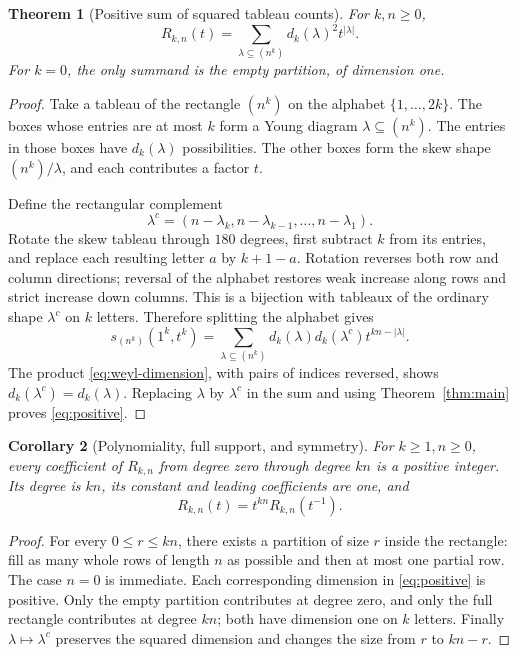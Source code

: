 \documentclass[11pt,a4paper]{article}
\newtheorem{theorem}{Theorem}[section]
\newtheorem{corollary}[theorem]{Corollary}
\theoremstyle{definition}
\theoremstyle{remark}
\numberwithin{equation}{section}
\begin{document}
\begin{theorem}[Positive sum of squared tableau counts]
\label{thm:positive}
For \(k,n\ge0\),
\begin{equation}
 \boxed{\displaystyle
 R_{k,n}(t)=\sum_{\lambda\subseteq(n^k)}d_k(\lambda)^2t^{|\lambda|}.}
 \label{eq:positive}
\end{equation}
For \(k=0\), the only summand is the empty partition, of dimension one.
\end{theorem}
\begin{proof}
Take a tableau of the rectangle \((n^k)\) on the alphabet
\(\{1,\ldots,2k\}\). The boxes whose entries are at most \(k\) form a
Young diagram \(\lambda\subseteq(n^k)\). The entries in those boxes have
\(d_k(\lambda)\) possibilities. The other boxes form the skew shape
\((n^k)/\lambda\), and each contributes a factor \(t\).

Define the rectangular complement
\begin{equation}
 \lambda^c=(n-\lambda_k,n-\lambda_{k-1},\ldots,n-\lambda_1).
 \label{eq:complement}
\end{equation}
Rotate the skew tableau through \(180\) degrees, first subtract \(k\)
from its entries, and replace each resulting letter \(a\) by \(k+1-a\).
Rotation reverses both row and column directions; reversal of the alphabet
restores weak increase along rows and strict increase down columns. This is
a bijection with tableaux of the ordinary shape \(\lambda^c\) on \(k\)
letters. Therefore splitting the alphabet gives
\[
 s_{(n^k)}(1^k,t^k)
 =\sum_{\lambda\subseteq(n^k)}
 d_k(\lambda)d_k(\lambda^c)t^{kn-|\lambda|}.
\]
The product \eqref{eq:weyl-dimension}, with pairs of indices reversed,
shows \(d_k(\lambda^c)=d_k(\lambda)\). Replacing \(\lambda\) by
\(\lambda^c\) in the sum and using Theorem~\ref{thm:main} proves
\eqref{eq:positive}.
\end{proof}

\begin{corollary}[Polynomiality, full support, and symmetry]
\label{cor:support}
For \(k\ge1,n\ge0\), every coefficient of \(R_{k,n}\) from degree zero
through degree \(kn\) is a positive integer. Its degree is \(kn\), its
constant and leading coefficients are one, and
\begin{equation}
 R_{k,n}(t)=t^{kn}R_{k,n}(t^{-1}).
 \label{eq:palindrome}
\end{equation}
\end{corollary}
\begin{proof}
For every \(0\le r\le kn\), there exists a partition of size \(r\) inside
the rectangle: fill as many whole rows of length \(n\) as possible and
then at most one partial row. The case \(n=0\) is immediate. Each
corresponding dimension in \eqref{eq:positive} is positive. Only the empty
partition contributes at degree zero, and only the full rectangle
contributes at degree \(kn\); both have dimension one on \(k\) letters.
Finally \(\lambda\mapsto\lambda^c\) preserves the squared dimension and
changes the size from \(r\) to \(kn-r\).
\end{proof}
\end{document}
